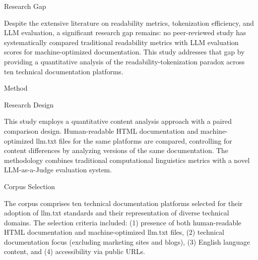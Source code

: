 \documentclass[10pt,conference,a4paper]{IEEEtran}
\makeatletter
\let\oldsection\section
\let\oldsubsection\subsection
\renewcommand{\section}{%
    \@ifstar{\sectionStar}{\sectionNoStar}%
}
\newcommand{\sectionStar}[1]{%
    \oldsection*{#1}%
    \vspace{-4pt}%
}
\newcommand{\sectionNoStar}[1]{%
    \oldsection{#1}%
    \vspace{-4pt}%
}
\renewcommand{\subsection}{%
    \@ifstar{\subsectionStar}{\subsectionNoStar}%
}
\newcommand{\subsectionStar}[1]{%
    \oldsubsection*{\textit{#1}}%
    \vspace{-3pt}%
}
\newcommand{\subsectionNoStar}[1]{%
    \oldsubsection{\textit{#1}}%
    \vspace{-3pt}%
}
\makeatother
\begin{document}
\subsection{Research Gap}

Despite the extensive literature on readability metrics, tokenization efficiency, and LLM evaluation, a significant research gap remains: no peer-reviewed study has systematically compared traditional readability metrics with LLM evaluation scores for machine-optimized documentation. This study addresses that gap by providing a quantitative analysis of the readability-tokenization paradox across ten technical documentation platforms.

\section{Method}

\subsection{Research Design}

This study employs a quantitative content analysis approach with a paired comparison design. Human-readable HTML documentation and machine-optimized llm.txt files for the same platforms are compared, controlling for content differences by analyzing versions of the same documentation. The methodology combines traditional computational linguistics metrics with a novel LLM-as-a-Judge evaluation system.

\subsection{Corpus Selection}

The corpus comprises ten technical documentation platforms selected for their adoption of llm.txt standards and their representation of diverse technical domains. The selection criteria included: (1) presence of both human-readable HTML documentation and machine-optimized llm.txt files, (2) technical documentation focus (excluding marketing sites and blogs), (3) English language content, and (4) accessibility via public URLs.
\end{document}
